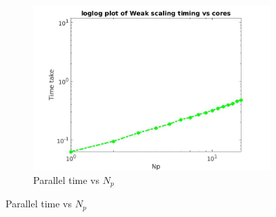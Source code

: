 \documentclass{article}
\begin{document}
\newpage
\begin{figure}
    \begin{subfigure}{\textwidth}
    \centering
    \includegraphics[scale=0.33]{timing-weakscaling.jpeg}
    \caption{Parallel time vs $N_p$}
    \label{fig:doc1}
    \end{subfigure}


\end{figure}
\end{document}
